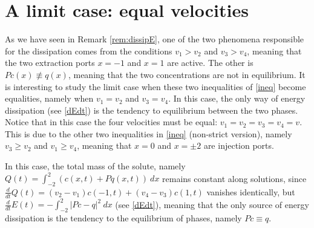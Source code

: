 \documentclass[a4paper]{article}
\newtheorem{rem}[thm]{Remark}
\numberwithin{equation}{section}
\begin{document}
%
%
\section{A limit case: equal velocities}\label{limit}
As we have seen in Remark \ref{rem:dissipE}, one of the two phenomena responsible for the dissipation comes from the conditions  $v_1>v_2$ and $v_3>v_4$, meaning that the two extraction ports $x=-1$ and $x=1$ are active. The other is  $Pc(x)\not\equiv q(x)$, meaning that the two concentrations are not in equilibrium. It is interesting to study the limit case when these two inequalities of \eqref{ineq} become equalities, namely when $v_1=v_2$ and $v_3=v_4$. In this case, the only way of energy dissipation (see \eqref{dEdt}) is the tendency to equilibrium between the two phases. Notice that in this case the four velocities must be equal: $v_1=v_2=v_3=v_4=v$. This is due to the other two inequalities in \eqref{ineq} (non-strict version), namely $v_3\ge v_2$ and $v_1\ge v_4$, meaning that $x=0$ and $x=\pm 2$ are injection ports.

In this case, the total mass of the solute, namely $Q(t)=\int_{-2}^2(c(x,t)+Pq(x,t))\ dx$ remains constant along solutions, since $\frac{d}{dt}Q(t)=(v_2-v_1)c(-1,t)+(v_4-v_3)c(1,t)$ vanishes identically, but $\frac{d}{dt}E(t)=-\int_{-2}^2 |Pc-q|^2\ dx$ (see \eqref{dEdt}), meaning that the only source of energy dissipation is the tendency to the equilibrium of phases, namely $Pc\equiv q$.
\end{document}
